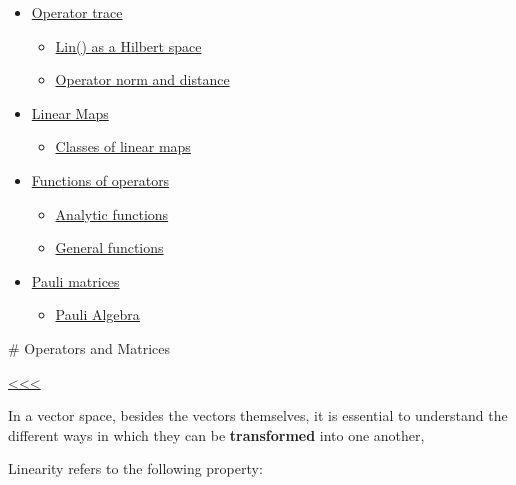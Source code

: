 \documentclass[11pt]{article}
\providecommand{\tightlist}{%
      \setlength{\itemsep}{0pt}\setlength{\parskip}{0pt}}
\begin{document}
\begin{itemize}
\item
  \hyperref[optrace]{Operator trace}

  \begin{itemize}
  \tightlist
  \item
    \hyperref[linhil]{Lin(\Hil) as a Hilbert space}
  \item
    \hyperref[op_norm]{Operator norm and distance}
  \end{itemize}
\end{itemize}

\begin{itemize}
\tightlist
\item
  \hyperref[lin_map]{Linear Maps}

  \begin{itemize}
  \tightlist
  \item
    \hyperref[class_lin_map]{Classes of linear maps}
  \end{itemize}
\end{itemize}

\begin{itemize}
\tightlist
\item
  \hyperref[func_op]{Functions of operators}

  \begin{itemize}
  \tightlist
  \item
    \hyperref[anal_fun]{Analytic functions}
  \item
    \hyperref[gen_func]{General functions}
  \end{itemize}
\end{itemize}

\begin{itemize}
\tightlist
\item
  \hyperref[paulis]{Pauli matrices}

  \begin{itemize}
  \tightlist
  \item
    \hyperref[pauli_alg]{Pauli Algebra}
  \end{itemize}
\end{itemize}

    \# Operators and Matrices

\hyperref[top]{<<<}

    In a vector space, besides the vectors themselves, it is essential to
understand the different ways in which they can be \textbf{transformed}
into one another,

    

    Linearity refers to the following property:
\end{document}
